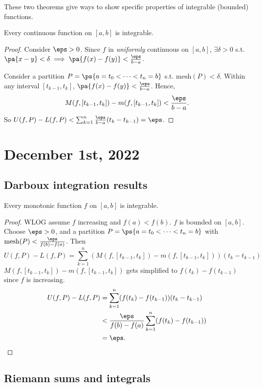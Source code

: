 \documentclass[11pt]{scrartcl}
\numberwithin{equation}{section}
\begin{document}
These two theorems give ways to show specific properties of integrable 
(bounded) functions.
\begin{theorem}
    Every continuous function on $[a,b]$ is integrable.
\end{theorem}
\begin{proof}
    Consider $\eps>0$. Since $f$ in \textit{uniformly} continuous on $[a,b]$, $\exists \delta>0$ s.t. $\pa{x-y}<\delta \implies \pa{f(x)-f(y)}<\frac{\eps}{b-a}$. 
    
    Consider a partition $P = \ps{a=t_0<\cdots<t_n=b}$
    s.t. $\mathrm{mesh}(P) < \delta$.
    Within any interval $[t_{k-1},t_k]$, $\pa{f(x)-f(y)}<\frac{\eps}{b-a}$.
    Hence, 
    \[
        M(f,[t_{k-1},t_k]) - m(f,[t_{k-1},t_k]) < \frac{\eps}{b-a}.
    \]
    So $U(f,P)-L(f,P)<\sum_{k=1}^{n}\frac{\eps}{b-a}(t_k-t_{k-1}) = \eps$.
\end{proof}
\clearpage
\section{December 1st, 2022}
\subsection{Darboux integration results}
\begin{theorem}
    Every monotonic function $f$ on $[a,b]$ is integrable.
\end{theorem}
\begin{proof}
    WLOG assume $f$ increasing and $f(a)<f(b)$.
    $f$ is bounded on $[a,b]$. Choose $\eps>0$, and a partition 
    $P = \ps{a=t_0<\cdots<t_n=b}$ with $\mathrm{mesh}(P) < \frac{\eps}{f(b)-f(a)}$. Then 
    \[
        U(f,P) - L(f,P) = \sum_{k=1}^{n}(M(f, [t_{k-1},t_k])-m(f, [t_{k-1},t_k]))(t_k - t_{k-1})
    \]
    $M(f, [t_{k-1},t_k])-m(f, [t_{k-1},t_k])$ gets simplified to $f(t_k)-f(t_{k-1})$ since $f$ is increasing.
    \begin{align*}
        U(f,P) - L(f,P) &= \sum_{k=1}^{n}(f(t_k)-f(t_{k-1}))(t_k - t_{k-1}) \\
        &< \frac{\eps}{f(b)-f(a)} \sum_{k=1}^{n}(f(t_k)-f(t_{k-1}))\\
        &= \eps. \qedhere
    \end{align*}
\end{proof}
\subsection{Riemann sums and integrals}
\end{document}
